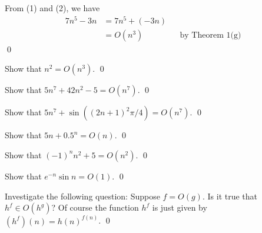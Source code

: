 From (1) and (2), we have
\begin{align*}
7n^5 - 3n 
&= 7n^5 + (-3n) \\
&= O(n^3) & & \text{by Theorem 1(g)} 
\end{align*}
\qed


\begin{ex}
Show that $n^2 = O(n^3)$.
\qed
\end{ex}

\begin{ex}
Show that $5n^7 + 42n^2 - 5 = O(n^7)$.
\qed
\end{ex}

\begin{ex}
Show that $5n^7 + \sin ((2n+1)^2 \pi/4) = O(n^7)$.
\qed
\end{ex}

\begin{ex}
Show that $5n + 0.5^n = O(n)$.
\qed
\end{ex}

\begin{ex}
Show that $(-1)^n n^2 + 5 = O(n^2)$.
\qed
\end{ex}

\begin{ex}
Show that $e^{-n} \sin n = O(1)$.
\qed
\end{ex}


\begin{ex}
Investigate the following question: Suppose $f = O(g)$. Is it
true that $h^f \in O(h^g)$? Of course the function $h^f$ is just
given by $(h^f)(n) = h(n)^{f(n)}$.
\qed
\end{ex}
